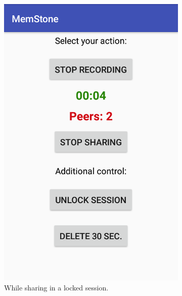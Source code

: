 \documentclass[mscthesis]{usiinfthesis}
\begin{document}
\begin{figure} [!ht]
\begin{subfigure}{0.31\textwidth}
\includegraphics[width=\linewidth]{Lock_Session}
\caption{While sharing in a locked session.} \label{figp:1a}
\end{subfigure}
\hspace*{\fill} %
\begin{subfigure}{0.31\textwidth}

\end{subfigure}
\end{figure}
\end{document}
